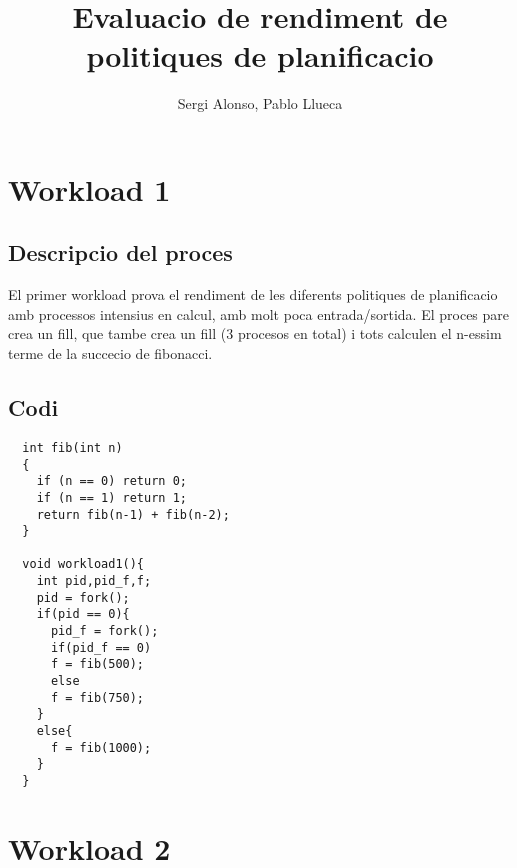 \documentclass{article}
\title{Evaluacio de rendiment de politiques de planificacio}
\author{Sergi Alonso, Pablo Llueca}
\begin{document}

\section{Workload 1}
\subsection{Descripcio del proces}
El primer workload prova el rendiment de les diferents politiques de planificacio amb processos intensius en calcul, amb molt poca entrada/sortida. El proces pare crea un fill, que tambe crea un fill (3 procesos en total) i tots calculen el n-essim terme de la succecio de fibonacci.

\subsection{Codi}
\begin{lstlisting}
  int fib(int n)
  {
    if (n == 0) return 0;
    if (n == 1) return 1;
    return fib(n-1) + fib(n-2);
  }

  void workload1(){
    int pid,pid_f,f;
    pid = fork();
    if(pid == 0){
      pid_f = fork();
      if(pid_f == 0)
      f = fib(500);
      else
      f = fib(750);
    }
    else{
      f = fib(1000);
    }
  }
\end{lstlisting}


\section{Workload 2}
\end{document}

